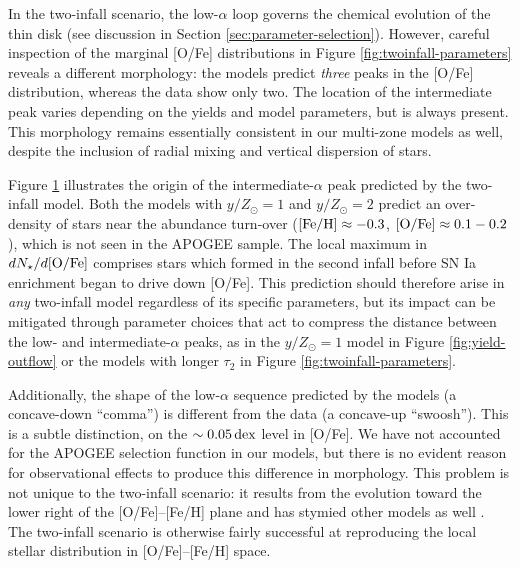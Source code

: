 \documentclass[twocolumn,twocolappendix,linenumbers]{aastex631}
\newcommand{\mathFeH}{{\rm [Fe/H]}}
\newcommand{\mathOFe}{{\rm [O/Fe]}}
\newcommand{\dex}{\,{\rm dex}}
\begin{document}
\begin{figure}
    \label{fig:ofe-feh-density}
\end{figure}

In the two-infall scenario, the low-$\alpha$ loop governs the chemical evolution of the thin disk (see discussion in Section \ref{sec:parameter-selection}). However, careful inspection of the marginal [O/Fe] distributions in Figure \ref{fig:twoinfall-parameters} reveals a different morphology: the models predict {\it three} peaks in the [O/Fe] distribution, whereas the data show only two. The location of the intermediate peak varies depending on the yields and model parameters, but is always present. This morphology remains essentially consistent in our multi-zone models as well, despite the inclusion of radial mixing and vertical dispersion of stars.

Figure \ref{fig:ofe-feh-density} illustrates the origin of the intermediate-$\alpha$ peak predicted by the two-infall model. Both the models with $y/Z_\odot=1$ and $y/Z_\odot=2$ predict an over-density of stars near the abundance turn-over ($\mathFeH\approx-0.3$, $\mathOFe\approx0.1-0.2$), which is not seen in the APOGEE sample. The local maximum in $dN_\star/d\mathOFe$ comprises stars which formed in the second infall before SN Ia enrichment began to drive down [O/Fe]. This prediction should therefore arise in {\it any} two-infall model regardless of its specific parameters, but its impact can be mitigated through parameter choices that act to compress the distance between the low- and intermediate-$\alpha$ peaks, as in the $y/Z_\odot=1$ model in Figure \ref{fig:yield-outflow} or the models with longer $\tau_2$ in Figure \ref{fig:twoinfall-parameters}.

Additionally, the shape of the low-$\alpha$ sequence predicted by the models (a concave-down ``comma'') is different from the data (a concave-up ``swoosh''). This is a subtle distinction, on the $\sim0.05\dex$ level in [O/Fe]. We have not accounted for the APOGEE selection function in our models, but there is no evident reason for observational effects to produce this difference in morphology. This problem is not unique to the two-infall scenario: it results from the evolution toward the lower right of the [O/Fe]--[Fe/H] plane and has stymied other models as well \citep[e.g.,][]{minchev_chemodynamical_2013,johnson_stellar_2021,prantzos_origin_2023}. The two-infall scenario is otherwise fairly successful at reproducing the local stellar distribution in [O/Fe]--[Fe/H] space.
\end{document}
